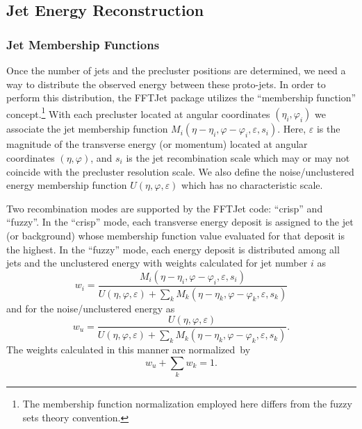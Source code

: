 \documentclass[epsf,12pt,titlepage]{article}
\newcommand{\cname}[1]{\index{#1}\textsf{#1}}
\begin{document}

\subsection{Jet Energy Reconstruction}

\subsubsection{Jet Membership Functions}

Once the number of jets and the precluster positions are determined,
we need a way to distribute the observed energy between these proto-jets.
In order to perform this distribution, the FFTJet package
utilizes the ``membership function'' concept.\footnote{The membership
function normalization employed here differs from the 
fuzzy sets theory convention.}
With each precluster located
at angular coordinates $(\eta_i, \varphi_i)$ we associate the jet
membership function $M_{i}(\eta - \eta_i, \varphi - \varphi_i, \varepsilon, s_i)$.
Here, $\varepsilon$ is the magnitude of the transverse energy (or momentum) located at 
angular coordinates $(\eta, \varphi)$, and $s_i$ is the jet recombination scale
which may or may not coincide with the precluster resolution scale.
We also define the noise/unclustered energy membership function
$U(\eta, \varphi, \varepsilon)$ which has no characteristic scale.

Two recombination modes are supported by the FFTJet code: ``crisp'' and ``fuzzy''.
In the ``crisp'' mode,  each transverse energy deposit is assigned to the jet
(or background) whose membership function value evaluated for that deposit
is the highest. In the ``fuzzy'' mode, each energy deposit is distributed among
all jets and the unclustered energy with weights calculated for jet number $i$ as
$$
w_i = \frac{M_{i}(\eta - \eta_i, \varphi - \varphi_i, \varepsilon, s_i)}{U(\eta, \varphi, \varepsilon) + \sum_{k} M_{k}(\eta - \eta_k, \varphi - \varphi_k, \varepsilon, s_k)}
$$
and for the noise/unclustered energy as
$$
w_u = \frac{U(\eta, \varphi, \varepsilon)}{U(\eta, \varphi, \varepsilon) + \sum_{k} M_{k}(\eta - \eta_k, \varphi - \varphi_k, \varepsilon, s_k)}.
$$
The weights calculated in this manner are normalized~by
$$
w_u + \sum_{k} w_k = 1.
$$
\end{document}
